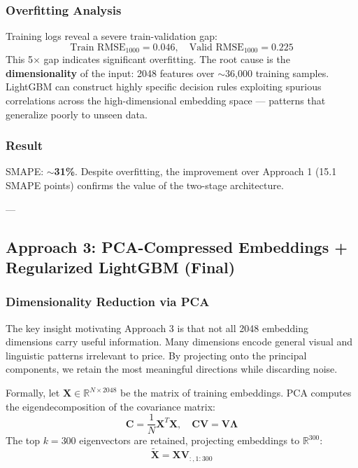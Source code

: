 \documentclass[conference]{IEEEtran}
\begin{document}
\subsubsection{Overfitting Analysis}
Training logs reveal a severe train-validation gap:
\begin{equation}
\text{Train RMSE}_{1000} = 0.046, \quad \text{Valid RMSE}_{1000} = 0.225
\end{equation}
This 5$\times$ gap indicates significant overfitting. The root cause is the \textbf{dimensionality} of the input: 2048 features over $\sim$36,000 training samples. LightGBM can construct highly specific decision rules exploiting spurious correlations across the high-dimensional embedding space — patterns that generalize poorly to unseen data.

\subsubsection{Result}
SMAPE: \textbf{$\sim$31\%}. Despite overfitting, the improvement over Approach 1 (15.1 SMAPE points) confirms the value of the two-stage architecture.

---

\subsection{Approach 3: PCA-Compressed Embeddings + Regularized LightGBM (Final)}

\subsubsection{Dimensionality Reduction via PCA}
The key insight motivating Approach 3 is that not all 2048 embedding dimensions carry useful information. Many dimensions encode general visual and linguistic patterns irrelevant to price. By projecting onto the principal components, we retain the most meaningful directions while discarding noise.

Formally, let $\mathbf{X} \in \mathbb{R}^{N \times 2048}$ be the matrix of training embeddings. PCA computes the eigendecomposition of the covariance matrix:
\begin{equation}
\mathbf{C} = \frac{1}{N} \mathbf{X}^T \mathbf{X}, \quad \mathbf{C} \mathbf{V} = \mathbf{V} \boldsymbol{\Lambda}
\end{equation}
The top $k=300$ eigenvectors are retained, projecting embeddings to $\mathbb{R}^{300}$:
\begin{equation}
\tilde{\mathbf{X}} = \mathbf{X} \mathbf{V}_{:,1:300}
\end{equation}
\end{document}
